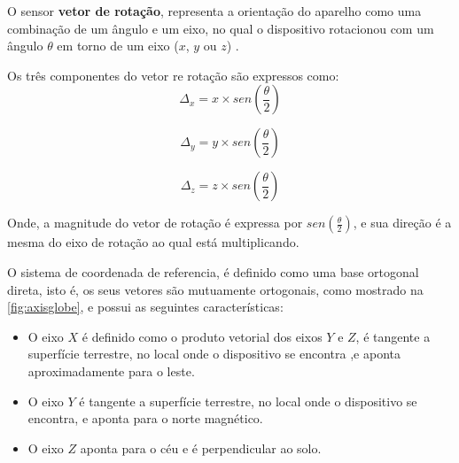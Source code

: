 O sensor \textbf{vetor de rotação}, representa a orientação do aparelho como uma combinação de um ângulo e um eixo, no qual o dispositivo rotacionou com um ângulo $\theta$ em torno de um eixo ($x$, $y$ ou $z$) . \par
Os três componentes do vetor re rotação são expressos como:\\

\begin{equation}
\Delta_x = x \times sen(\frac{\theta}{2})
\label{eq:vec_rot_x}
\end{equation}

\begin{equation}
\Delta_y = y \times sen(\frac{\theta}{2})
\label{eq:vec_rot_y}
\end{equation}

\begin{equation}
\Delta_z = z \times sen(\frac{\theta}{2})
\label{eq:vec_rot_z}
\end{equation}

Onde, a magnitude do vetor de rotação é expressa por $sen(\frac{\theta}{2})$, e sua direção é a mesma do eixo de rotação ao qual está multiplicando.\par

O sistema de coordenada de referencia, é definido como uma base ortogonal direta, isto é, os seus vetores são mutuamente ortogonais, como mostrado na \autoref{fig:axisglobe}, e possui as seguintes características:\par
\begin{itemize}
\item O eixo $X$ é definido como o produto vetorial dos eixos $Y$ e $Z$, é tangente a superfície terrestre, no local onde o dispositivo se encontra ,e aponta aproximadamente para o leste.\par

\item O eixo $Y$ é tangente a superfície terrestre, no local onde o dispositivo se encontra, e aponta para o norte magnético. \par

\item O eixo $Z$ aponta para o céu e é perpendicular ao solo.
\end{itemize}